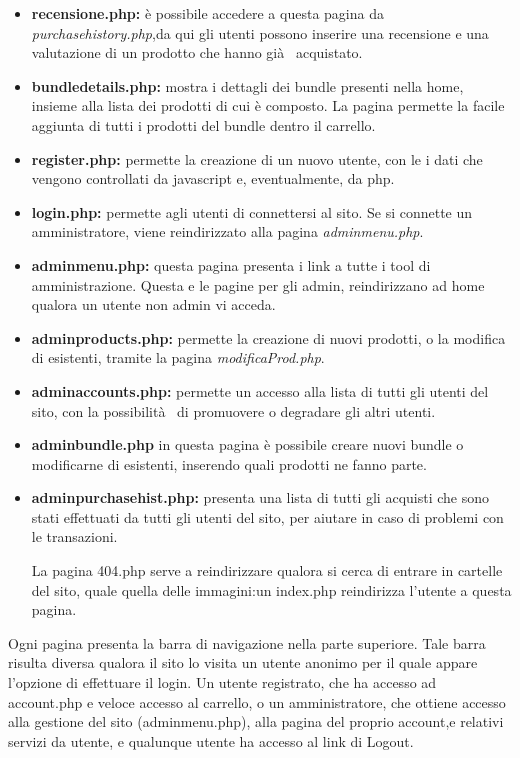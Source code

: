 \begin{itemize}
\item \textbf{recensione.php:} è possibile accedere a questa pagina da \textit{purchasehistory.php},da qui gli utenti possono inserire una recensione e una valutazione di un prodotto che hanno già  acquistato.

\item \textbf{bundledetails.php:} mostra i dettagli dei bundle presenti nella home, insieme alla lista dei prodotti di cui è composto. La pagina permette la facile aggiunta di tutti i prodotti del bundle dentro il carrello.

\item \textbf{register.php:} permette la creazione di un nuovo utente, con le i dati che vengono controllati da javascript e, eventualmente, da php.

\item \textbf{login.php:} permette agli utenti di connettersi al sito. Se si connette un amministratore, viene reindirizzato alla pagina \textit{adminmenu.php}.

\item \textbf{adminmenu.php:} questa pagina presenta i link a tutte i tool di amministrazione. Questa e le pagine per gli admin, reindirizzano ad home qualora un utente non admin vi acceda.

\item \textbf{adminproducts.php:} permette la creazione di nuovi prodotti, o la modifica di esistenti, tramite la pagina \textit{modificaProd.php}.

\item \textbf{adminaccounts.php:} permette un accesso alla lista di tutti gli utenti del sito, con la possibilità  di promuovere o degradare gli altri utenti.

\item \textbf{adminbundle.php} in questa pagina è possibile creare nuovi bundle o modificarne di esistenti, inserendo quali prodotti ne fanno parte.

\item \textbf{adminpurchasehist.php:} presenta una lista di tutti gli acquisti che sono stati effettuati da tutti gli utenti del sito, per aiutare in caso di problemi con le transazioni.

La pagina 404.php serve a reindirizzare qualora si cerca di entrare in cartelle del sito, quale quella delle immagini:un index.php reindirizza l'utente a questa pagina.

\end{itemize}
Ogni pagina presenta la barra di navigazione nella parte superiore. Tale barra risulta diversa qualora il sito lo visita un utente anonimo per il quale appare l'opzione di effettuare il login. Un utente registrato, che ha accesso ad account.php e veloce accesso al carrello, o un amministratore, che ottiene accesso alla gestione del sito (adminmenu.php), alla pagina del proprio account,e relativi servizi da utente, e qualunque utente ha accesso al link di Logout.

